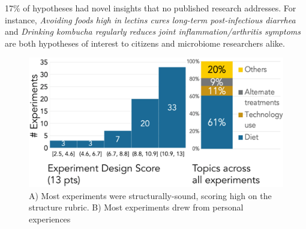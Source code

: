 \textit{}

17\% of hypotheses had novel insights that no published research addresses. For instance, \textit{Avoiding foods high in lectins cures long-term post-infectious diarrhea} and \textit{Drinking kombucha regularly reduces joint inflammation/arthritis symptoms} are both hypotheses of interest to citizens and microbiome researchers alike.

\begin{figure}[h] 
\centering
  \includegraphics[width=1.0\textwidth]{figures/galileo/galileo-study2-1}
  \caption[Results: Most experiments were structurally-sound and drew from personal experiences]
{A) Most experiments were structurally-sound, scoring high on the structure rubric. B) Most experiments drew from personal experiences }
  \label{fig:galileo-result2}
\end{figure}

